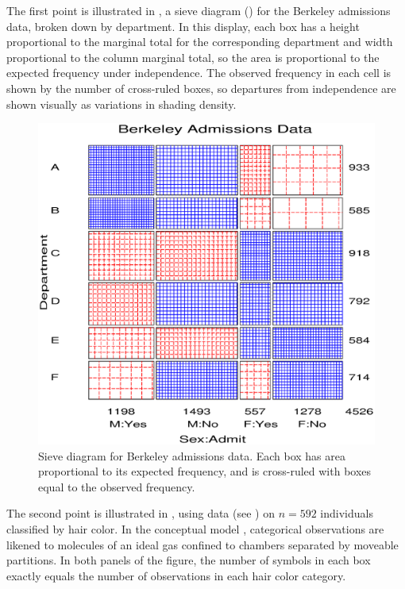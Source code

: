 The first point is illustrated in ,
a sieve diagram ()
for the Berkeley admissions data, broken down by department.
In this display, each box has a height proportional to the marginal total
for the corresponding department and width proportional to the column
marginal total, so the area is proportional to the expected frequency
under independence.  The observed frequency in each cell is shown
by the number of cross-ruled boxes, so departures from independence
are shown visually as variations in shading density.
\begin{figure}[htb]
  \centering
  \includegraphics[scale=.6]{ch1/fig/sievebrk1}
  \caption[Sieve diagram for Berkeley admissions data]{Sieve diagram for Berkeley admissions data.  Each box has area proportional to its expected frequency, and is cross-ruled with boxes equal to the observed frequency.}\label{fig:sievebrk1}
\end{figure}

The second point is illustrated in ,
using data (see ) on $n=592$ individuals
classified by hair color.
In the conceptual model
\citep{Friendly:95,Sall:91b}, categorical observations are likened to
molecules of an ideal gas confined to chambers separated by moveable
partitions.  In both panels of the figure, the number of symbols in each box exactly
equals the number of observations in each hair color category.

